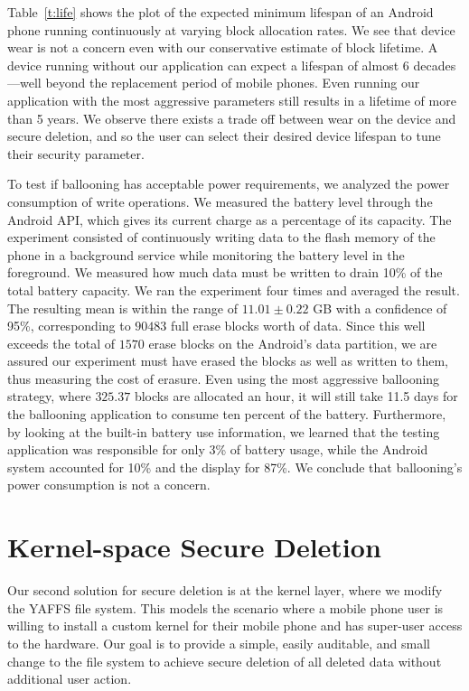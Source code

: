 \documentclass{acmtog}
\begin{document}
Table~\ref{t:life} shows the plot of the expected minimum lifespan of an
Android phone running continuously at varying block allocation
rates. We see that device wear is  not a concern even with
our conservative estimate of block lifetime. A device running without
our application can expect a lifespan of almost 6 decades---well beyond the
replacement period of mobile phones. Even running our application with
the most aggressive parameters still results in a lifetime of more than 5 years.
We observe there exists a trade off between wear on the device and secure
deletion, and so the user can select their desired device lifespan to
tune their security parameter.

To test if ballooning has acceptable power requirements, we
analyzed the
power consumption of write operations. We measured the battery level 
through the Android API, which gives its current charge as a
percentage of its capacity.  The experiment consisted of continuously
writing data to the flash memory of the phone in a background service
while monitoring the battery level in the foreground. We measured
how much data must be written to drain 10\% of the total
battery capacity.  We ran the experiment four times and averaged the
result. The resulting mean is within the range of $11.01\pm0.22$ GB
with a confidence of 95\%, corresponding
to $90483$ full erase blocks worth of data. Since this well exceeds
the total of $1570$ erase blocks on the Android's data partition, we
are assured our experiment must have erased the blocks as well as written to
them, thus measuring the cost of erasure.
Even using the most aggressive ballooning strategy, where $325.37$
blocks are allocated an hour, it will still take 11.5 days for the
ballooning application to consume ten percent of the
battery. Furthermore, by looking at the built-in battery use information, 
we learned that the testing
application was responsible for only 3\% of battery usage, while the
Android system accounted for 10\% and the display for 87\%. We
conclude that ballooning's power consumption is not a concern.


\section{Kernel-space Secure Deletion}
Our second solution for secure deletion is at the kernel layer, where we modify the
YAFFS file system. This models the
scenario where a mobile phone user is willing to install a custom kernel for
their mobile phone and has super-user access to the hardware.
Our goal is to provide a simple, easily auditable, and small change to the file system to achieve
secure deletion of all deleted data without additional user action.
\end{document}
